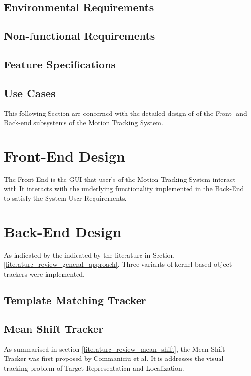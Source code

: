 \subsection{Environmental Requirements}


\subsection{Non-functional Requirements}


\subsection{Feature Specifications}


\subsection{Use Cases}


This following Section are concerned with the detailed design of of the Front- and Back-end
subsystems of the Motion Tracking System.

\section{Front-End Design}
The Front-End is the GUI that user's of the Motion Tracking System interact with 
It interacts with the underlying functionality implemented in the Back-End to
satisfy the System User Requirements. 

\section{Back-End Design}
As indicated by the indicated by the literature in Section
\ref{literature_review_general_approach}. Three variants of kernel based object
trackers were implemented.

\subsection{Template Matching Tracker}


\subsection{Mean Shift Tracker}
As summarised in section \ref{literature_review_mean_shift}, the Mean Shift Tracker was
first proposed by Commaniciu et al. It is addresses the
visual tracking problem of Target Representation and Localization.

